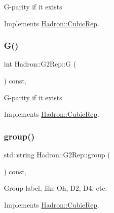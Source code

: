 G-\/parity if it exists 

Implements \mbox{\hyperlink{structHadron_1_1CubicRep_a52104e43266d1614c00bbd1c3b395458}{Hadron\+::\+Cubic\+Rep}}.

\mbox{\label{structHadron_1_1G2Rep_ad27dff08ddb0fa10f2dc503f47cdd766}} 
\subsubsection{\texorpdfstring{G()}{G()}\hspace{0.1cm}{\footnotesize\ttfamily [2/2]}}
{\footnotesize\ttfamily int Hadron\+::\+G2\+Rep\+::G (\begin{DoxyParamCaption}{ }\end{DoxyParamCaption}) const\hspace{0.3cm}{\ttfamily [inline]}, {\ttfamily [virtual]}}

G-\/parity if it exists 

Implements \mbox{\hyperlink{structHadron_1_1CubicRep_a52104e43266d1614c00bbd1c3b395458}{Hadron\+::\+Cubic\+Rep}}.

\mbox{\label{structHadron_1_1G2Rep_a6314a9f6f255a4916e007936876f6135}} 
\subsubsection{\texorpdfstring{group()}{group()}\hspace{0.1cm}{\footnotesize\ttfamily [1/2]}}
{\footnotesize\ttfamily std\+::string Hadron\+::\+G2\+Rep\+::group (\begin{DoxyParamCaption}{ }\end{DoxyParamCaption}) const\hspace{0.3cm}{\ttfamily [inline]}, {\ttfamily [virtual]}}

Group label, like Oh, D2, D4, etc. 

Implements \mbox{\hyperlink{structHadron_1_1CubicRep_a0748f11ec87f387062c8e8981339a29c}{Hadron\+::\+Cubic\+Rep}}.

\mbox{\label{structHadron_1_1G2Rep_a6314a9f6f255a4916e007936876f6135}} 
